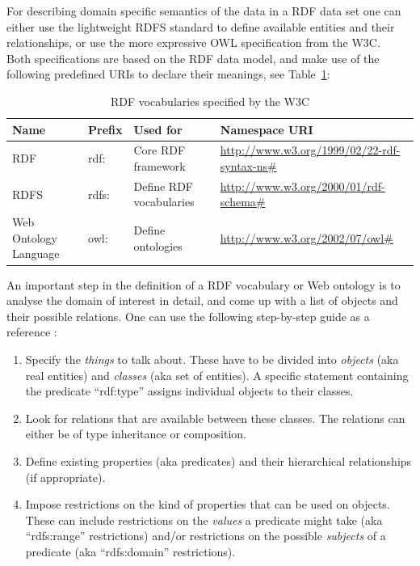For describing domain specific semantics of the data in a \gls{RDF} data set one can either use the lightweight \gls{RDFS} standard to define available entities and their relationships, or use the more expressive \gls{OWL} specification from the \gls{W3C}. \\

Both specifications are based on the \gls{RDF} data model, and make use of the following predefined \gls{URI}s to declare their meanings, see Table~\ref{tab:w3c_vocab_rdf}: \@

\begin{table}[H]
\centering
\begin{tabular}{p{3cm}llp{4.5cm}}
\hline
\textbf{Name} & \textbf{Prefix} & \textbf{Used for} & \textbf{Namespace URI} \\
\hline
\gls{RDF} & rdf: & Core \gls{RDF} framework & \url{http://www.w3.org/1999/02/22-rdf-syntax-ns\#} \\
\hline
\gls{RDFS} & rdfs: & Define \gls{RDF} vocabularies & \url{http://www.w3.org/2000/01/rdf-schema\#} \\
\hline
Web Ontology Language & owl: & Define ontologies & \url{http://www.w3.org/2002/07/owl\#} \\
\hline
\end{tabular}
\caption[\gls{RDF} vocabularies specified by the \gls{W3C}]{\gls{RDF} vocabularies specified by the \gls{W3C} \citep[pg. 41]{wood2014linked}}
\label{tab:w3c_vocab_rdf}
\end{table}

An important step in the definition of a \gls{RDF} vocabulary or Web ontology is to analyse the domain of interest in detail, and come up with a list of objects and their possible relations. One can use the following step-by-step guide as a reference \citep[pg. 40-55]{antoniou2012semantic}: \@

\begin{enumerate}
	\item Specify the \emph{things} to talk about. These have to be divided into \emph{objects} (aka real entities) and \emph{classes} (aka set of entities). A specific statement containing the predicate ``rdf:type'' assigns individual objects to their classes.
	\item Look for relations that are available between these classes. The relations can either be of type inheritance or composition.
	\item Define existing properties (aka predicates) and their hierarchical relationships (if appropriate).
	\item Impose restrictions on the kind of properties that can be used on objects. These can include restrictions on the \emph{values} a predicate might take (aka ``rdfs:range'' restrictions) and/or restrictions on the possible \emph{subjects} of a predicate (aka ``rdfs:domain'' restrictions).
\end{enumerate}


